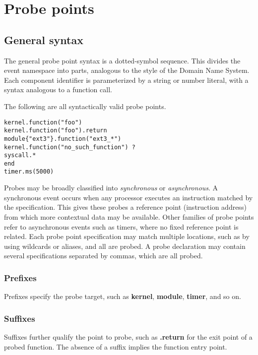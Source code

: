 \documentclass[twoside,english]{article}
\newenvironment{vindent}
{\begin{list}{}{\setlength{\listparindent}{6pt}}
\item[]}
{\end{list}}
\begin{document}
\section{Probe points\label{sec:Probe-Points}}
\subsection{General syntax}
The general probe point syntax is a dotted-symbol sequence. This divides
the event namespace into parts, analogous to the style of the Domain Name
System. Each component identifier is parameterized by a string or number
literal, with a syntax analogous to a function call.

The following are all syntactically valid probe points.

\begin{vindent}
\begin{verbatim}
kernel.function("foo")
kernel.function("foo").return
module{"ext3"}.function("ext3_*")
kernel.function("no_such_function") ?
syscall.*
end
timer.ms(5000)
\end{verbatim}
\end{vindent}
Probes may be broadly classified into \emph{synchronous}
or \emph{asynchronous}. A synchronous event occurs when
any processor executes an instruction matched by the specification. This
gives these probes a reference point (instruction address) from which more
contextual data may be available. Other families of probe points refer to
asynchronous events such as timers, where no fixed reference point is related.
Each probe point specification may match multiple locations, such as by using
wildcards or aliases, and all are probed. A probe declaration may contain
several specifications separated by commas, which are all probed.

\subsubsection{Prefixes}
Prefixes specify the probe target, such as \textbf{kernel}, \textbf{module},
\textbf{timer}, and so on.

\subsubsection{Suffixes}
Suffixes further qualify the point to probe, such as \textbf{.return} for the
exit point of a probed function. The absence of a suffix implies the function 
entry point.
\end{document}
